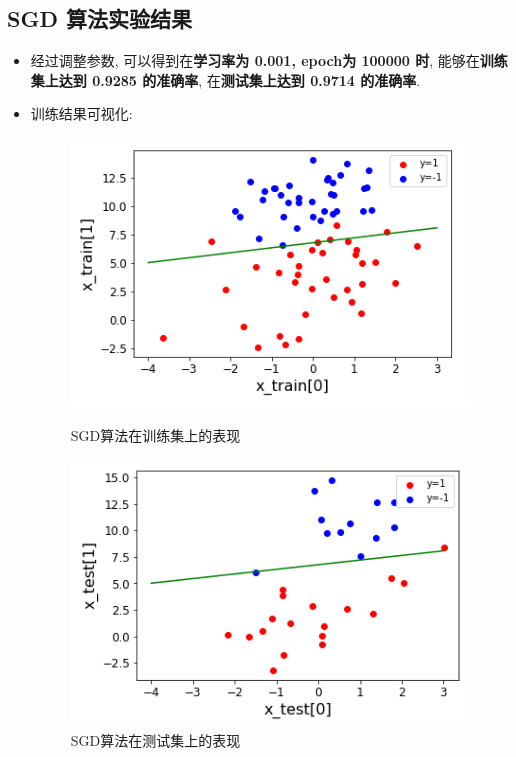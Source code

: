 \documentclass[UTF8]{article}
\begin{document}
\subsection{SGD 算法实验结果}
\begin{itemize}
	\item 经过调整参数, 可以得到在\textbf{学习率为 0.001, epoch为 100000 时}, 能够在\textbf{训练集上达到 0.9285 的准确率}, 在\textbf{测试集上达到 0.9714 的准确率}.
	\item 训练结果可视化:
	\begin{figure}[H]
		\begin{minipage}[H]{0.5\linewidth}
			\centering
			\includegraphics[width=\linewidth]{sgd_train.png}
			\caption{SGD算法在训练集上的表现}
		\end{minipage}
		\begin{minipage}[H]{0.5\linewidth}
			\centering
			\includegraphics[width=\linewidth]{sgd_test.png}
			\caption{SGD算法在测试集上的表现}
		\end{minipage}
	\end{figure}
\end{itemize}
\end{document}
